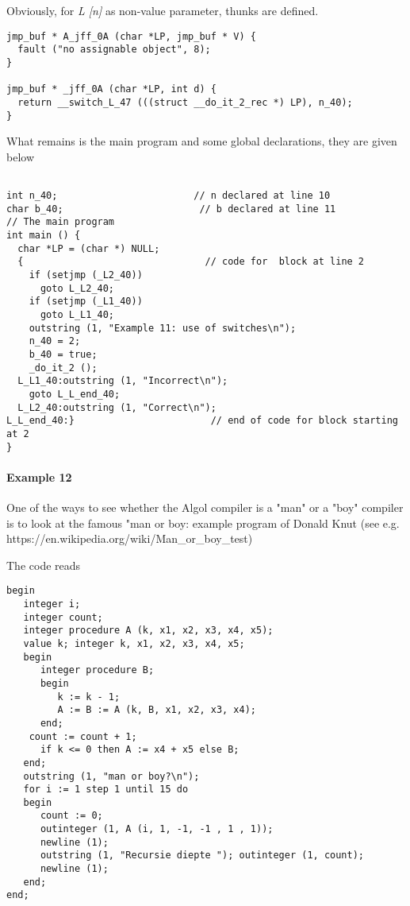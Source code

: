\documentclass[11pt]{article}
\begin{document}
Obviously, for {\em L [n]} as non-value parameter, thunks are defined.
{\footnotesize
\begin{verbatim}
jmp_buf * A_jff_0A (char *LP, jmp_buf * V) {
  fault ("no assignable object", 8);
}

jmp_buf * _jff_0A (char *LP, int d) {
  return __switch_L_47 (((struct __do_it_2_rec *) LP), n_40);
}
\end{verbatim}
}
What remains is the main program and some global declarations, they are
given below
{\footnotesize
\begin{verbatim}

int n_40;                        // n declared at line 10
char b_40;                        // b declared at line 11
// The main program
int main () {
  char *LP = (char *) NULL;
  {                                // code for  block at line 2 
    if (setjmp (_L2_40))
      goto L_L2_40;
    if (setjmp (_L1_40))
      goto L_L1_40;
    outstring (1, "Example 11: use of switches\n");
    n_40 = 2;
    b_40 = true;
    _do_it_2 ();
  L_L1_40:outstring (1, "Incorrect\n");
    goto L_L_end_40;
  L_L2_40:outstring (1, "Correct\n");
L_L_end_40:}                        // end of code for block starting at 2
}
\end{verbatim}
}

\paragraph{Example 12}
One of the ways to see whether the Algol compiler is a "man" or a "boy"
compiler is to look at the famous "man or boy: example program of
Donald Knut (see  e.g. https://en.wikipedia.org/wiki/Man\_or\_boy\_test)

The code reads
{\footnotesize
\begin{verbatim}
begin
   integer i;
   integer count;
   integer procedure A (k, x1, x2, x3, x4, x5);
   value k; integer k, x1, x2, x3, x4, x5;
   begin
      integer procedure B;
      begin
         k := k - 1;
         A := B := A (k, B, x1, x2, x3, x4);
      end;
	count := count + 1;
      if k <= 0 then A := x4 + x5 else B;
   end;
   outstring (1, "man or boy?\n");
   for i := 1 step 1 until 15 do
   begin
      count := 0;
      outinteger (1, A (i, 1, -1, -1 , 1 , 1));
      newline (1);
      outstring (1, "Recursie diepte "); outinteger (1, count);
      newline (1);
   end;
end;
\end{verbatim}
}
\end{document}
